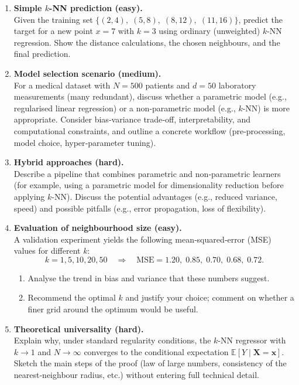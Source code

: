 \documentclass[12pt, a4paper]{article}
\begin{document}
\begin{enumerate}[label=\textbf{Q\arabic.}, leftmargin=, itemsep=12pt]
\item \textbf{Simple \(k\)-NN prediction (easy).}\\
Given the training set \(\{(2,4),\;(5,8),\;(8,12),\;(11,16)\}\), predict the target for a new point \(x=7\) with \(k=3\) using ordinary (unweighted) \(k\)-NN regression.  Show the distance calculations, the chosen neighbours, and the final prediction.

\item \textbf{Model selection scenario (medium).}\\
For a medical dataset with \(N=500\) patients and \(d=50\) laboratory measurements (many redundant), discuss whether a parametric model (e.g., regularised linear regression) or a non‑parametric model (e.g., \(k\)-NN) is more appropriate.  Consider bias‑variance trade‑off, interpretability, and computational constraints, and outline a concrete workflow (pre‑processing, model choice, hyper‑parameter tuning).

\item \textbf{Hybrid approaches (hard).}\\
Describe a pipeline that combines parametric and non‑parametric learners (for example, using a parametric model for dimensionality reduction before applying \(k\)-NN).  Discuss the potential advantages (e.g., reduced variance, speed) and possible pitfalls (e.g., error propagation, loss of flexibility).

\item \textbf{Evaluation of neighbourhood size (easy).}\\
A validation experiment yields the following mean‑squared‑error (MSE) values for different \(k\):
\[
k = 1, 5, 10, 20, 50 \quad\Longrightarrow\quad
\text{MSE}= 1.20,\;0.85,\;0.70,\;0.68,\;0.72 .
\]
\begin{enumerate}[label=(\alph)]
\item Analyse the trend in bias and variance that these numbers suggest.  
\item Recommend the optimal \(k\) and justify your choice; comment on whether a finer grid around the optimum would be useful.
\end{enumerate}

\item \textbf{Theoretical universality (hard).}\\
Explain why, under standard regularity conditions, the \(k\)-NN regressor with \(k\!\to\!1\) and \(N\!\to\!\infty\) converges to the conditional expectation \(\mathbb{E}[Y\mid\mathbf{X}=\mathbf{x}]\).  Sketch the main steps of the proof (law of large numbers, consistency of the nearest‑neighbour radius, etc.) without entering full technical detail.

\end{enumerate}
\end{document}
